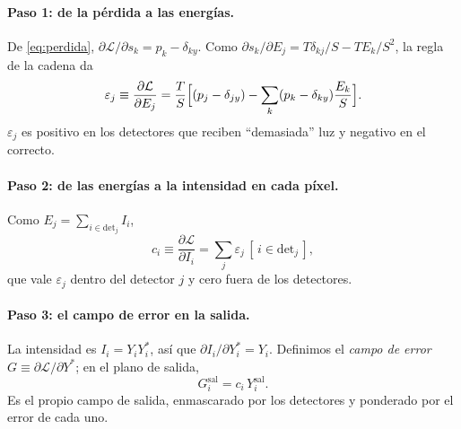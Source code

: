 \paragraph{Paso 1: de la pérdida a las energías.} De \eqref{eq:perdida},
$\partial\mathcal{L}/\partial s_k=p_k-\delta_{ky}$. Como
$\partial s_k/\partial E_j=T\delta_{kj}/S-TE_k/S^2$, la regla de la cadena da
\begin{equation}
  \varepsilon_j\equiv\frac{\partial\mathcal{L}}{\partial E_j}
  =\frac{T}{S}\Bigl[(p_j-\delta_{jy})-\sum_k (p_k-\delta_{ky})\frac{E_k}{S}\Bigr].
  \label{eq:paso1}
\end{equation}
$\varepsilon_j$ es positivo en los detectores que reciben ``demasiada'' luz y negativo en el
correcto.

\paragraph{Paso 2: de las energías a la intensidad en cada píxel.} Como
$E_j=\sum_{i\in\text{det}_j}I_i$,
\begin{equation}
  c_i\equiv\frac{\partial\mathcal{L}}{\partial I_i}=\sum_j\varepsilon_j\,[\,i\in\text{det}_j\,],
  \label{eq:paso2}
\end{equation}
que vale $\varepsilon_j$ dentro del detector $j$ y cero fuera de los detectores.

\paragraph{Paso 3: el campo de error en la salida.} La intensidad es $I_i=Y_iY_i^*$, así que
$\partial I_i/\partial Y_i^*=Y_i$. Definimos el \emph{campo de error}
$G\equiv\partial\mathcal{L}/\partial Y^*$; en el plano de salida,
\begin{equation}
  G^{\text{sal}}_i=c_i\,Y^{\text{sal}}_i .
  \label{eq:paso3}
\end{equation}
Es el propio campo de salida, enmascarado por los detectores y ponderado por el error de cada
uno.

